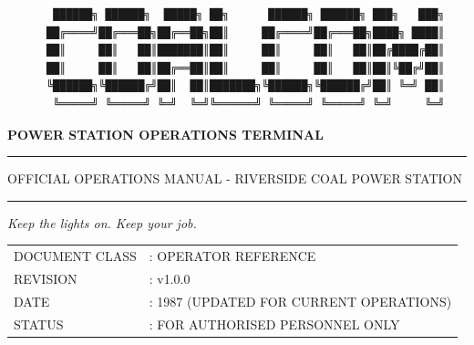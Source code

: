\documentclass[10pt,a5paper]{article}
\begin{document}
\thispagestyle{plain}
\begin{center}
\vspace*{8mm}

{\linespread{0.5}
\begin{verbatim}
       ██████╗ ██████╗  █████╗ ██╗      ██████╗ ██████╗ ███╗   ███╗
      ██╔════╝██╔═══██╗██╔══██╗██║     ██╔════╝██╔═══██╗████╗ ████║
      ██║     ██║   ██║███████║██║     ██║     ██║   ██║██╔████╔██║
      ██║     ██║   ██║██╔══██║██║     ██║     ██║   ██║██║╚██╔╝██║
      ╚██████╗╚██████╔╝██║  ██║███████╗╚██████╗╚██████╔╝██║ ╚═╝ ██║
       ╚═════╝ ╚═════╝ ╚═╝  ╚═╝╚══════╝ ╚═════╝ ╚═════╝ ╚═╝     ╚═╝
\end{verbatim}}

{\large\textbf{POWER STATION OPERATIONS TERMINAL}}\\[1mm]


\vspace{4mm}
\rule{\linewidth}{0.6pt}%

{\normalsize OFFICIAL OPERATIONS MANUAL - RIVERSIDE COAL POWER STATION}

\rule{\linewidth}{0.6pt}

\textit{Keep the lights on. Keep your job.}
\end{center}


\vfill

\begin{tabular}{ll}
  DOCUMENT CLASS & : OPERATOR REFERENCE \\
  REVISION       & : v1.0.0\\
  DATE           & : 1987 (UPDATED FOR CURRENT OPERATIONS) \\
  STATUS         & : FOR AUTHORISED PERSONNEL ONLY \\
\end{tabular}



\newpage

\tableofcontents

\end{document}
